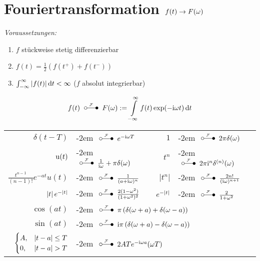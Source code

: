 \documentclass[german,color,5pt]{latex4ei/latex4ei_fs}
\begin{document}
\section{Fouriertransformation \quad $f(t) \rightarrow F(\omega)$}
\begin{sectionbox}
	\emph{Voraussetzungen:}
	\begin{enumerate}
		\item $f$ stückweise stetig differenzierbar
		\item $f(t) = \frac{1}{2}\left(f(t^+) + f(t^-)\right)$
		\item $\int_{-\infty}^{\infty}\abs{f(t)} \diff t < \infty$ ($f$ absolut integrierbar)
	\end{enumerate}
	\begin{emphbox}\vspace{-5pt}
		\[f(t)\FT F(\omega) := \int\limits_{-\infty}^\infty f(t) \exp(-\i \omega t) \diff t\]
	\end{emphbox}
	\begin{tabular}{rlrl}
		$\delta(t-T)$ & \kern-2em  $\FT e^{-\i \omega T}$                       &                                   $1$ & \kern-2em  $\FT 2\pi \delta(\omega)$            \\
		    $\operatorname{u}(t)$ & \kern-2em  $\FT \frac{1}{\i \omega} + \pi \delta(\omega)$ &                                 $t^n$ & \kern-2em  $\FT 2\pi \i^n \delta^{(n)}(\omega)$ \\
 $\frac{t^{n-1}}{(n-1)!} e^{-at} u(t)$ & \kern-2em  $\FT \frac{1}{(a+\i \omega)^n}$ &               		          $|t^n|$ & \kern-2em  $\FT \frac{2n!}{(\i \omega)^{n+1}}$   \\
 $\left\vert t\right\vert e^{-\left\vert t\right\vert}$ & \kern-2em $\FT \frac{2(1-\omega^2)}{(1+\omega^2)^2}$ & $e^{-\left\vert t\right\vert}$ & \kern-2em $\FT \frac{2}{1+\omega^2}$ \\
	$\cos(at)$ & \multicolumn{3}{l}{\kern-2em $\FT \pi\left(\delta(\omega+a)+\delta(\omega-a)\right)$}\\
	$\sin(at)$ & \multicolumn{3}{l}{\kern-2em $\FT \i\pi\left(\delta(\omega+a)-\delta(\omega-a)\right)$}\\
	$\begin{cases}
	A, & \left\vert t-a\right\vert\le T \\
	0, & \left\vert t-a\right\vert >  T
	\end{cases}$ & \multicolumn{3}{l}{\kern-2em $\FT 2ATe^{-\i\omega a} \si(\omega T)$}
	\end{tabular}

\end{sectionbox}
\end{document}
